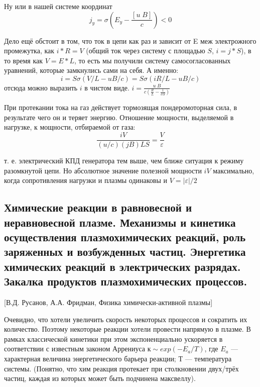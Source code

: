 \documentclass[10pt, a4paper]{article}
\begin{document}
Ну или в нашей системе координат 
\begin{equation}
	j_y=\sigma(E_y-\frac{[u\;B]}{c}) <0
\end{equation}

Дело ещё обстоит в том, что ток в цепи как раз и зависит от E меж электрожного промежутка, как $i*R=V$ (общий ток через систему с площадью $S$, $i=j*S$), в то время как $V=E*L$, то есть мы получили систему самосогласованных уравнений, которые замкнулись сами на себя. А именно:
\begin{equation}
	i=S \sigma(V/L-uB/c)=S \sigma(iR/L-uB/c)
\end{equation}
отсюда можно выразить $i$ в чистом виде. $i=\frac{u\;B}{c(\frac{R}{L}-\frac{1}{\sigma S})}$

При протекании тока на газ действует тормозящая пондеромоторная сила, в результате чего он и теряет энергию. Отношение мощности, выделяемой в нагрузке, к мощности, отбираемой от газа: 
\begin{equation}
	\frac{iV}{(u/c)(jB)LS}=\frac{V}{\varepsilon}
\end{equation}

т. е. электрический КПД генератора тем выше, чем ближе ситуация к режиму разомкнутой цепи. Но абсолютное значение полезной мощности $iV$ максимально, когда сопротивления нагрузки и плазмы одинаковы и $V=|\varepsilon|/2$


\subsection{Химические реакции в равновесной и неравновесной плазме. \textcolor[rgb]{1,0,0}{Механизмы и кинетика осуществления плазмохимических реакций, роль заряженных и возбужденных частиц. Энергетика химических реакций в электрических разрядах}. Закалка продуктов плазмохимических процессов.}

\label{14.6}

 
[В.Д. Русанов, А.А. Фридман, Физика химически-активной плазмы]

Очевидно, что хотели увеличить скорость некоторых процессов и сократить их количество. Поэтому некоторые реакции хотели провести напрямую в плазме. В рамках классической кинетики при этом экспоненциально ускоряется в соответствии с известным законом Аррениуса $ к \sim exp(-E_{a}/T)$, где $E_a$ — характерная величина энергетического барьера реакции; Т — температура системы. (Понятно, что хим реакция протекает при столкновении двух/трёх частиц, каждая из которых может быть подчинена максвеллу).
 
\end{document}
